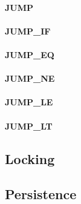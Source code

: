 \documentclass[12pt,a4paper]{article}
\begin{document}
\paragraph{JUMP}
\paragraph{JUMP\_IF}
\paragraph{JUMP\_EQ}
\paragraph{JUMP\_NE}
\paragraph{JUMP\_LE}
\paragraph{JUMP\_LT}

\subsection{Locking}\label{sec:locking}

\subsection{Persistence}\label{sec:persistence}
\end{document}
